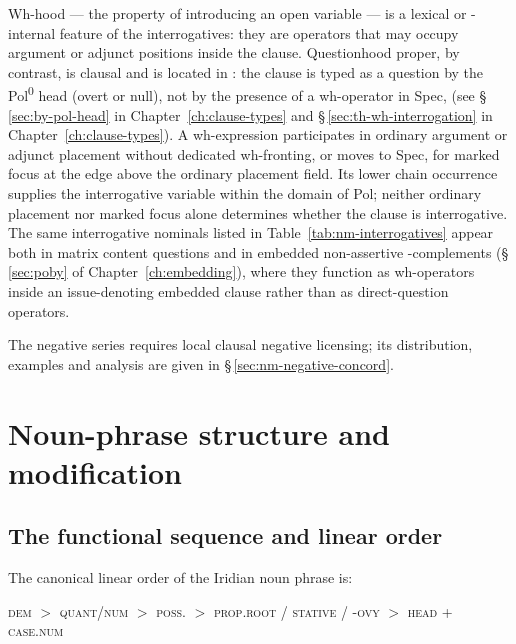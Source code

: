 Wh-hood ---
the property of introducing an open variable --- is a lexical or
-internal feature of the interrogatives: they are operators
that may occupy argument or adjunct positions inside the clause. Questionhood
proper, by contrast, is clausal and is located in : the clause is
typed as a question by the Pol\textsuperscript{0} head (overt  or null),
not by the presence of a wh-operator in Spec, (see
§\,\ref{sec:by-pol-head} in Chapter~\ref{ch:clause-types} and
§\,\ref{sec:th-wh-interrogation} in Chapter~\ref{ch:clause-types}). A wh-expression participates in ordinary argument or adjunct placement
without dedicated wh-fronting, or moves to Spec, for marked
focus at the edge above the ordinary placement field. Its lower chain
occurrence supplies the interrogative variable within the domain of Pol;
neither ordinary placement nor marked focus alone determines whether the
clause is interrogative. The same
interrogative nominals listed in Table~\ref{tab:nm-interrogatives} appear both
in matrix content questions and in embedded non-assertive -complements
(§\,\ref{sec:poby} of Chapter~\ref{ch:embedding}), where they function as
wh-operators inside an issue-denoting embedded clause rather than as
direct-question operators.

\pex
\a {} 
\a {} 
\a {} 
\a {}  
\xe

The negative series requires local clausal negative licensing; its distribution,
examples and analysis are given in §\,\ref{sec:nm-negative-concord}.

\FloatBarrier

\section{Noun-phrase structure and modification}
\label{sec:nm-np-structure}

\subsection{The functional sequence and linear order}
\label{sec:nm-funcseq}

The canonical linear order of the Iridian noun phrase is:

\begin{center}
\textsc{dem} $>$ \textsc{quant/num} $>$
\textsc{poss}.\Ind{} $>$ \textsc{prop.root / stative / -ovy} $>$
\textsc{head} + \textsc{case.num}
\end{center}

